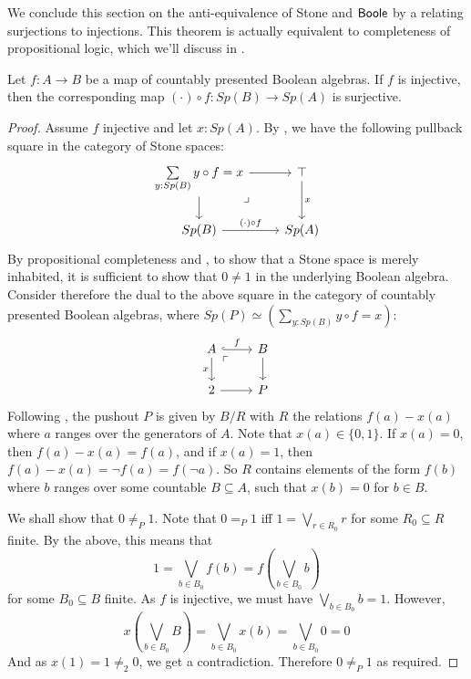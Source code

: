 We conclude this section on the anti-equivalence of Stone and $\mathsf{Boole}$ by a relating surjections to injections. 
This theorem is actually equivalent to completeness of propositional logic, which we'll discuss in 
. 
\begin{theorem}\label{FormalSurjectionsAreSurjections}
  Let $f:A\to B$ be a map of countably presented Boolean algebras. 
  If $f$ is injective, then the corresponding map $(\cdot) \circ f : Sp(B) \to Sp(A)$ is surjective. 
\end{theorem}

\begin{proof}
  Assume $f$ injective and let $x:Sp(A)$.
  By , we have the following pullback square in the category of Stone spaces:
  \begin{equation}\begin{tikzcd}
    \sum\limits_{y:Sp(B)} y\circ f = x \arrow[d] \arrow[r] \arrow["\lrcorner"{pos=0.125}, phantom, dr] 
    & \top \arrow[d,"x"]\\
    Sp(B) \arrow[r,"(\cdot) \circ f"] & Sp(A)
  \end{tikzcd}  \end{equation}
  By propositional completeness and ,
  to show that a Stone space is merely inhabited, it is sufficient to show that $0\neq 1$ in the underlying Boolean algebra. 
  Consider therefore the dual to the above square in the category of countably presented Boolean algebras,
  where $Sp(P) \simeq  (\sum\limits_{y:Sp(B)} y \circ f = x)$:
  \begin{equation}\begin{tikzcd}
    A \arrow[d,"x"'] \arrow[r,hook,"f"] \arrow[rd,phantom,"\ulcorner"{pos=0.125}] & B\arrow[d]\\
    2 \arrow[r] & P
  \end{tikzcd}\end{equation} 
  Following , the pushout $P$ is given by $B/R$ with $R$ the relations $f(a) -x(a)$ 
  where $a$ ranges over the generators of $A$.
  Note that $x(a) \in \{0,1\}$. 
  If $x(a)=0$, then $f(a)-x(a) = f(a)$, 
  and if $x(a) = 1$, then $f(a) -x(a) = \neg f(a) = f(\neg a)$. 
  So $R$ contains elements of the form $f(b)$ where $b$ ranges over some countable $B\subseteq A$, 
  such that $x(b) = 0$ for $b\in B$. 
  
  We shall show that $0\neq_P 1$. 
  Note that $0=_P 1$ iff 
  $1 = \bigvee_{r \in R_0} r$ for some $R_0\subseteq R$ finite. 
  By the above, this means that 
  $$1= \bigvee_{b\in B_0} f(b) = f(\bigvee_{b\in B_0} b)$$ 
  for some $B_0\subseteq B$ finite. 
  As $f$ is injective, we must have $\bigvee_{b\in B_0} b  = 1$. 
  However, 
  $$x(\bigvee_{b\in B_0} B ) = \bigvee_{b \in B_0} x(b) = \bigvee_{b\in B_0} 0 = 0$$
  And as $x(1) = 1 \neq_2 0$, we get a contradiction. Therefore $0\neq_P 1$ as required. 



\end{proof}
